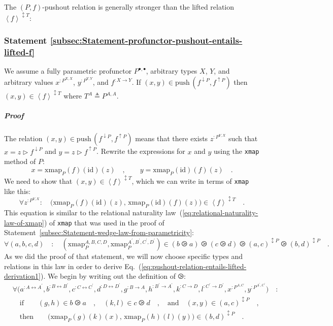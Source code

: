 The $\left(P,f\right)$-pushout relation is generally stronger than
the lifted relation $\left<f\right>^{\updownarrow T}$:

\subsubsection{Statement \label{subsec:Statement-profunctor-pushout-entails-lifted-f}\ref{subsec:Statement-profunctor-pushout-entails-lifted-f}}

We assume a fully parametric profunctor $P^{\bullet,\bullet}$, arbitrary
types $X$, $Y$, and arbitrary values $x^{:P^{X,X}}$, $y^{:P^{Y,Y}}$,
and $f^{:X\rightarrow Y}$. If $(x,y)\in\text{push}\,(f^{\downarrow P},f^{\uparrow P})$
then $(x,y)\in\left<f\right>^{\updownarrow T}$ where $T^{A}\triangleq P^{A,A}$.

\subparagraph{Proof}

The relation $(x,y)\in\text{push}\,(f^{\downarrow P},f^{\uparrow P})$
means that there exists $z^{:P^{Y,X}}$ such that $x=z\triangleright f^{\downarrow P}$
and $y=z\triangleright f^{\uparrow P}$. Rewrite the expressions for
$x$ and $y$ using the \lstinline!xmap! method of $P$:
\[
x=\text{xmap}_{P}(f)(\text{id})(z)\quad,\quad\quad y=\text{xmap}_{P}(\text{id})(f)(z)\quad.
\]
We need to show that $(x,y)\in\left<f\right>^{\updownarrow T}$, which
we can write in terms of \lstinline!xmap! like this:
\begin{equation}
\forall z^{:P^{Y,X}}:\quad\big(\text{xmap}_{P}(f)(\text{id})(z),\,\text{xmap}_{P}(\text{id})(f)(z)\big)\in\left<f\right>^{\updownarrow T}\quad.\label{eq:pushout-relation-entails-lifted-derivation1}
\end{equation}
This equation is similar to the relational naturality law~(\ref{eq:relational-naturality-law-of-xmap})
of \lstinline!xmap! that was used in the proof of Statement~\ref{subsec:Statement-wedge-law-from-parametricity}:
\[
\forall(a,b,c,d)\quad:\quad(\text{xmap}_{P}^{A,B,C,D},\text{xmap}_{P}^{A^{\prime},B^{\prime},C^{\prime},D^{\prime}})\in(b\ogreaterthan a)\ogreaterthan(c\ogreaterthan d)\ogreaterthan(a,c)^{\updownarrow P}\ogreaterthan(b,d)^{\updownarrow P}\quad.
\]
As we did the proof of that statement, we will now choose specific
types and relations in this law in order to derive Eq.~(\ref{eq:pushout-relation-entails-lifted-derivation1}).
We begin by writing out the definition of $\ogreaterthan$:
\begin{align}
 & \forall\big(a^{:A\leftrightarrow A^{\prime}},b^{:B\leftrightarrow B^{\prime}},c^{:C\leftrightarrow C^{\prime}},d^{:D\leftrightarrow D^{\prime}},g^{:B\rightarrow A},h^{:B^{\prime}\rightarrow A^{\prime}},k^{:C\rightarrow D},l^{:C^{\prime}\rightarrow D^{\prime}},x^{:P^{A,C}},y^{:P^{A^{\prime},C^{\prime}}}\big)\quad:\nonumber \\
 & \quad\text{if}\quad\quad(g,h)\in b\ogreaterthan a\quad,\quad(k,l)\in c\ogreaterthan d\quad,\quad\text{and}\quad(x,y)\in(a,c)^{\updownarrow P}\quad,\nonumber \\
 & \quad\text{then}\quad\quad\big(\text{xmap}_{P}(g)(k)(x),\,\text{xmap}_{P}(h)(l)(y)\big)\in(b,d)^{\updownarrow P}\quad.\label{eq:xmap-relational-law-derivation3}
\end{align}

